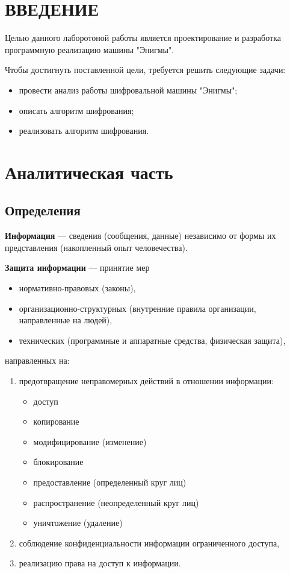 \chapter*{ВВЕДЕНИЕ}

Целью данного лаборотоной работы является проектирование и разработка программную реализацию машины "Энигмы".

Чтобы достигнуть поставленной цели, требуется решить следующие задачи:
\begin{itemize}
	\item провести анализ работы шифровальной машины "Энигмы";
	\item описать алгоритм шифрования;
	\item реализовать алгоритм шифрования.  
\end{itemize}

\chapter{Аналитическая часть}

\section{Определения}

\textbf{Информация}  --- сведения (сообщения, данные) независимо от формы их представления (накопленный опыт человечества).

\textbf{Защита информации} --- принятие мер
\begin{itemize}[label=---]
    \item нормативно-правовых (законы),
    \item организационно-структурных (внутренние правила организации, направленные на людей),
    \item технических (программные и аппаратные средства, физическая защита),
\end{itemize}
направленных на:
\begin{enumerate}
    \item предотвращение неправомерных действий в отношении информации:
    \begin{itemize}[label=---]
        \item доступ
        \item копирование
        \item модифицирование (изменение)
        \item блокирование
        \item предоставление (определенный круг лиц)
        \item распространение (неопределенный круг лиц)
        \item уничтожение (удаление)
    \end{itemize}
    \item соблюдение конфиденциальности информации ограниченного доступа,
    \item реализацию права на доступ к информации.
\end{enumerate}

